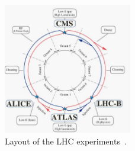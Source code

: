 \begin{figure}
\centering
\includegraphics[width=0.5\textwidth]{figures/lhc_and_cms/lhc_layout.png}
\caption{Layout of the LHC experiments~\cite{lhc_machine}.}
\label{lhc_layout}
\end{figure}